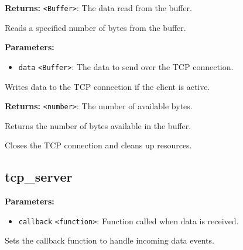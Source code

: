 \documentclass[12pt,a4paper]{article}
\begin{document}
\noindent \textbf{Returns:} \texttt{<Buffer>}: The data read from the buffer.

\noindent Reads a specified number of bytes from the buffer.

\vspace{5mm}
\noindent {}


\noindent \textbf{Parameters:}
\begin{itemize}
  \item \texttt{data} \texttt{<Buffer>}: The data to send over the TCP connection.
\end{itemize}

\noindent Writes data to the TCP connection if the client is active.

\vspace{5mm}
\noindent {}


\noindent \textbf{Returns:} \texttt{<number>}: The number of available bytes.

\noindent Returns the number of bytes available in the buffer.

\vspace{5mm}
\noindent {}


\noindent Closes the TCP connection and cleans up resources.


\subsection{tcp\_server}
\vspace{5mm}
\noindent {}


\noindent \textbf{Parameters:}
\begin{itemize}
  \item \texttt{callback} \texttt{<function>}: Function called when data is received.
\end{itemize}

\noindent Sets the callback function to handle incoming data events.
\end{document}
